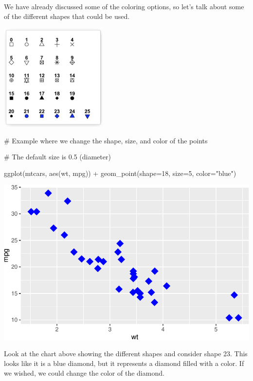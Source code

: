 \documentclass[
  letterpaper,
  DIV=11,
  numbers=noendperiod]{scrreprt}
\newenvironment{Shaded}{\begin{snugshade}}{\end{snugshade}}
\newcommand{\AttributeTok}[1]{\textcolor[rgb]{0.40,0.45,0.13}{#1}}
\newcommand{\CommentTok}[1]{\textcolor[rgb]{0.37,0.37,0.37}{#1}}
\newcommand{\DecValTok}[1]{\textcolor[rgb]{0.68,0.00,0.00}{#1}}
\newcommand{\FunctionTok}[1]{\textcolor[rgb]{0.28,0.35,0.67}{#1}}
\newcommand{\NormalTok}[1]{\textcolor[rgb]{0.00,0.23,0.31}{#1}}
\newcommand{\SpecialCharTok}[1]{\textcolor[rgb]{0.37,0.37,0.37}{#1}}
\newcommand{\StringTok}[1]{\textcolor[rgb]{0.13,0.47,0.30}{#1}}
\begin{document}
We have already discussed some of the coloring options, so let's talk
about some of the different shapes that could be used.

\includegraphics[width=0.4\textwidth,height=\textheight]{./images/AST_2.jpg}

\begin{Shaded}
\begin{Highlighting}[]
\CommentTok{\# Example where we change the shape, size, and color of the points}

\CommentTok{\# The default size is 0.5 (diameter)}

\FunctionTok{ggplot}\NormalTok{(mtcars, }\FunctionTok{aes}\NormalTok{(wt, mpg)) }\SpecialCharTok{+} 
  \FunctionTok{geom\_point}\NormalTok{(}\AttributeTok{shape=}\DecValTok{18}\NormalTok{, }\AttributeTok{size=}\DecValTok{5}\NormalTok{, }\AttributeTok{color=}\StringTok{"blue"}\NormalTok{)}
\end{Highlighting}
\end{Shaded}

\includegraphics{Advanced_Scatterplot_Techniques_files/figure-pdf/unnamed-chunk-5-1.pdf}

Look at the chart above showing the different shapes and consider shape
23. This looks like it is a blue diamond, but it represents a diamond
filled with a color. If we wished, we could change the color of the
diamond.
\end{document}
